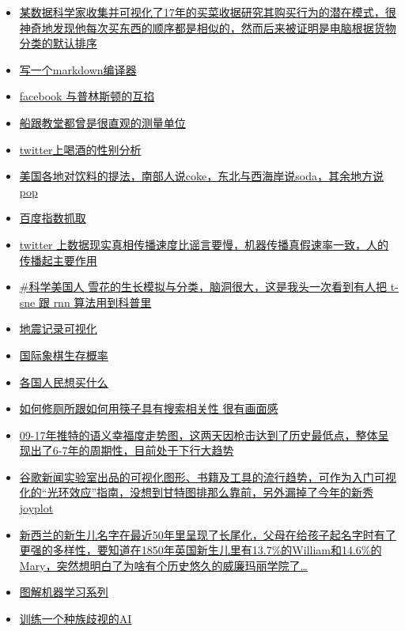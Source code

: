 \documentclass[]{book}
\begin{document}
\begin{itemize}
\item
  \href{http://sketches.christianlaesser.com/2018-01-08-shopping-pattern/}{某数据科学家收集并可视化了17年的买菜收据研究其购买行为的潜在模式，很神奇地发现他每次买东西的顺序都是相似的，然而后来被证明是电脑根据货物分类的默认排序}
\item
  \href{https://blog.beezwax.net/2017/07/07/writing-a-markdown-compiler/}{写一个markdown编译器}
\item
  \href{https://www.facebook.com/notes/mike-develin/debunking-princeton/10151947421191849}{facebook 与普林斯顿的互掐}
\item
  \href{http://longstreet.typepad.com/thesciencebookstore/2016/03/measuring-things-with-ships.html}{船跟教堂都曾是很直观的测量单位}
\item
  \href{https://qz.com/486704/this-is-how-men-and-women-drink-according-to-twitter/}{twitter上喝酒的性别分析}
\item
  \href{http://popvssoda.com/}{美国各地对饮料的提法，南部人说coke，东北与西海岸说soda，其余地方说pop}
\item
  \href{https://mp.weixin.qq.com/s/b3g-VycUoLaZgTWkgznU9g}{百度指数抓取}
\item
  \href{http://science.sciencemag.org/content/359/6380/1146}{twitter 上数据现实真相传播速度比谣言要慢，机器传播真假速率一致，人的传播起主要作用}
\item
  \href{https://blogs.scientificamerican.com/sa-visual/in-silico-flurries/}{\#科学美国人 雪花的生长模拟与分类，脑洞很大，这是我头一次看到有人把 t-sne 跟 rnn 算法用到科普里}
\item
  \href{https://geovisualist.com/2015/06/22/visualizing-100-years-of-earthquakes/}{地震记录可视化}
\item
  \href{https://www.quora.com/What-are-the-chances-of-survival-of-individual-chess-pieces-in-average-games}{国际象棋生存概率}
\item
  \href{https://www.fixr.com/blog/2015/04/17/world-of-obsessions/}{各国人民想买什么}
\item
  \href{http://how-to-fix-a-toilet.com/}{如何修厕所跟如何用筷子具有搜索相关性 很有画面感}
\item
  \href{http://hedonometer.org/index.html?from=2008-09-10}{09-17年推特的语义幸福度走势图，这两天因枪击达到了历史最低点，整体呈现出了6-7年的周期性，目前处于下行大趋势}
\item
  \href{http://visualizationuniverse.com/}{谷歌新闻实验室出品的可视化图形、书籍及工具的流行趋势，可作为入门可视化的``光环效应''指南，没想到甘特图排那么靠前，另外漏掉了今年的新秀joyplot}
\item
  \href{https://www.statschat.org.nz/2018/01/08/long-tail-of-baby-names/}{新西兰的新生儿名字在最近50年里呈现了长尾化，父母在给孩子起名字时有了更强的多样性，要知道在1850年英国新生儿里有13.7\%的William和14.6\%的Mary，突然想明白了为啥有个历史悠久的威廉玛丽学院了\ldots{}}
\item
  \href{http://www.r2d3.us/\%E5\%9B\%BE\%E8\%A7\%A3\%E6\%9C\%BA\%E5\%99\%A8\%E5\%AD\%A6\%E4\%B9\%A0/}{图解机器学习系列}
\item
  \href{https://notstatschat.rbind.io/2018/09/27/how-to-write-a-racist-ai-in-r-without-really-trying/}{训练一个种族歧视的AI}
\end{itemize}
\end{document}
